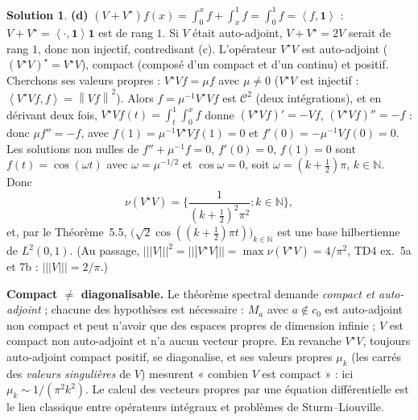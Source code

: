 \documentclass[11pt,a4paper]{article}
\newcommand{\N}{\mathbb{N}}
\newcommand{\norm}[1]{\left\|#1\right\|}
\newcommand{\opnorm}[1]{|\!|\!|#1|\!|\!|}
\newcommand{\ps}[2]{\left\langle #1,#2\right\rangle}
\theoremstyle{definition}
\newtheorem*{solution}{Solution}
\begin{document}
\begin{solution}
\medskip
\noindent\textbf{(d)} $(V+V^\star)f(x)=\int_0^xf+\int_x^1f=\int_0^1f=\ps f{\mathbf 1}$ : $V+V^\star=\ps\cdot{\mathbf 1}\mathbf 1$ est de rang $1$. Si $V$ était auto-adjoint, $V+V^\star=2V$ serait de rang $1$, donc non injectif, contredisant (c). L'opérateur $V^\star V$ est auto-adjoint ($(V^\star V)^\star=V^\star V$), compact (composé d'un compact et d'un continu) et positif. Cherchons ses valeurs propres : $V^\star Vf=\mu f$ avec $\mu\ne0$ ($V^\star V$ est injectif : $\ps{V^\star Vf}f=\norm{Vf}^2$). Alors $f=\mu^{-1}V^\star Vf$ est $\mathcal C^2$ (deux intégrations), et en dérivant deux fois, $V^\star Vf(t)=\int_t^1\int_0^xf$ donne $(V^\star Vf)'=-Vf$, $(V^\star Vf)''=-f$ : donc $\mu f''=-f$, avec $f(1)=\mu^{-1}V^\star Vf(1)=0$ et $f'(0)=-\mu^{-1}Vf(0)=0$. Les solutions non nulles de $f''+\mu^{-1}f=0$, $f'(0)=0$, $f(1)=0$ sont $f(t)=\cos(\omega t)$ avec $\omega=\mu^{-1/2}$ et $\cos\omega=0$, soit $\omega=(k+\frac12)\pi$, $k\in\N$. Donc
\[
\nu(V^\star V)=\Big\{\frac1{(k+\frac12)^2\pi^2}:k\in\N\Big\},
\]
et, par le Théorème~5.5, $\big(\sqrt2\cos((k+\tfrac12)\pi t)\big)_{k\in\N}$ est une base hilbertienne de $L^2(0,1)$.
(Au passage, $\opnorm V^2=\opnorm{V^\star V}=\max\nu(V^\star V)=4/\pi^2$, TD4 ex.~5a et 7b : $\opnorm V=2/\pi$.)
\end{solution}

\begin{pointcle}
\textbf{Compact $\ne$ diagonalisable.} Le théorème spectral demande \emph{compact et auto-adjoint} ; chacune des hypothèses est nécessaire : $M_a$ avec $a\notin c_0$ est auto-adjoint non compact et peut n'avoir que des espaces propres de dimension infinie ; $V$ est compact non auto-adjoint et n'a aucun vecteur propre. En revanche $V^\star V$, toujours auto-adjoint compact positif, se diagonalise, et ses valeurs propres $\mu_k$ (les carrés des \emph{valeurs singulières} de $V$) mesurent « combien $V$ est compact » : ici $\mu_k\sim1/(\pi^2k^2)$. Le calcul des vecteurs propres par une équation différentielle est le lien classique entre opérateurs intégraux et problèmes de Sturm--Liouville.
\end{pointcle}
\end{document}

